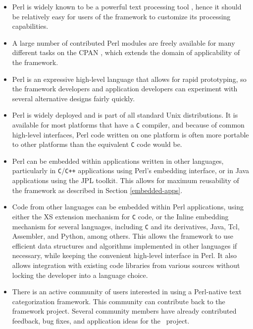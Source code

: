 \begin{itemize}
\item Perl is widely known to be a powerful text processing tool
   \cite{friedl:02, pedersen:01}, hence it should be
   relatively easy for users of the framework to customize its
   processing capabilities.
\item A large number of contributed Perl modules are freely available
   for many different tasks on the CPAN \cite{cpan}, which extends the
   domain of applicability of the framework.
\item Perl is an expressive high-level language that allows for rapid
   prototyping, so the framework developers and application developers
   can experiment with several alternative designs fairly quickly.
\item Perl is widely deployed and is part of all standard Unix
   distributions.  It is available for most platforms that have a
   \texttt{C} compiler, and because of common high-level interfaces,
   Perl code written on one platform is often more portable to other
   platforms than the equivalent \texttt{C} code would be.
\item Perl can be embedded within applications written in other
   languages, particularly in \texttt{C}/\texttt{C++} applications
   using Perl's embedding interface, or in Java applications using the
   JPL toolkit.  This allows for maximum reusability of the
   framework as described in Section \ref{embedded-apps}.
\item Code from other languages can be embedded within Perl
   applications, using either the XS extension mechanism for
   \texttt{C} code, or the Inline embedding mechanism for several
   languages, including \texttt{C} and its derivatives, Java, Tcl,
   Assembler, and Python, among others.  This allows the framework to
   use efficient data structures and algorithms implemented in other
   languages if necessary, while keeping the convenient high-level
   interface in Perl.  It also allows integration with existing code
   libraries from various sources without locking the developer into a
   language choice.
\item There is an active community of users interested in using a
   Perl-native text categorization framework.  This community can
   contribute back to the framework project.  Several community
   members have already contributed feedback, bug fixes, and
   application ideas for the \aicat\ project.
\end{itemize}

